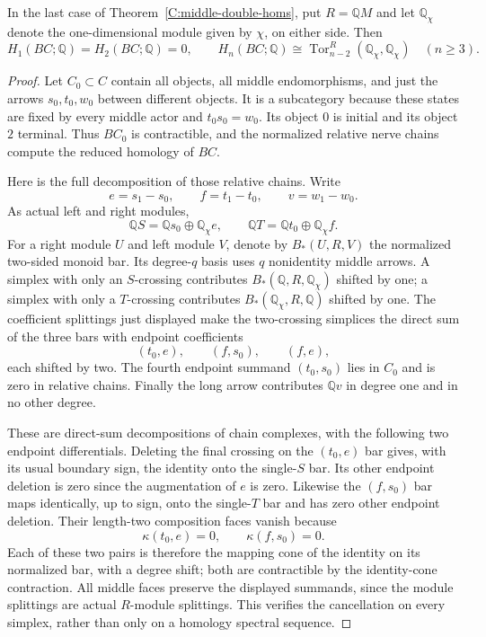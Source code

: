 \begin{lemma}
\label{C:AND-middle-bar}
In the last case of Theorem~\ref{C:middle-double-homs}, put
$R=\mathbb QM$ and let $\mathbb Q_\chi$ denote the
one-dimensional module given by $\chi$, on either side.
Then
\[
 H_1(BC;\mathbb Q)=H_2(BC;\mathbb Q)=0,
 \qquad
 H_n(BC;\mathbb Q)\cong
 \operatorname{Tor}_{n-2}^{R}
          (\mathbb Q_\chi,\mathbb Q_\chi)
 \quad(n\geq3).
\]
\end{lemma}
\begin{proof}
Let $C_0\subset C$ contain all objects, all middle
endomorphisms, and just the arrows $s_0,t_0,w_0$ between
different objects.  It is a subcategory because these states
are fixed by every middle actor and $t_0s_0=w_0$.
Its object $0$ is initial and its object $2$ terminal.
Thus $BC_0$ is contractible, and the normalized relative
nerve chains compute the reduced homology of $BC$.

Here is the full decomposition of those relative chains.
Write
\[
 e=s_1-s_0,\qquad f=t_1-t_0,\qquad v=w_1-w_0.
\]
As actual left and right modules,
\[
 \mathbb QS=\mathbb Qs_0\oplus\mathbb Q_\chi e,
 \qquad
 \mathbb QT=\mathbb Qt_0\oplus\mathbb Q_\chi f.
\]
For a right module $U$ and left module $V$, denote by
$B_*(U,R,V)$ the normalized two-sided monoid bar.  Its
degree-$q$ basis uses $q$ nonidentity middle arrows.  A
simplex with only an $S$-crossing contributes
$B_*(\mathbb Q,R,\mathbb Q_\chi)$ shifted by one; a
simplex with only a $T$-crossing contributes
$B_*(\mathbb Q_\chi,R,\mathbb Q)$ shifted by one.
The coefficient splittings just displayed make the
two-crossing simplices the direct sum of the three bars
with endpoint coefficients
\[
 (t_0,e),\qquad (f,s_0),\qquad (f,e),
\]
each shifted by two.  The fourth endpoint summand
$(t_0,s_0)$ lies in $C_0$ and is zero in relative chains.
Finally the long arrow contributes $\mathbb Qv$ in degree
one and in no other degree.

These are direct-sum decompositions of chain complexes,
with the following two endpoint differentials.  Deleting
the final crossing on the $(t_0,e)$ bar gives, with its
usual boundary sign, the identity onto the single-$S$
bar.  Its other endpoint deletion is zero since the
augmentation of $e$ is zero.  Likewise the $(f,s_0)$ bar
maps identically, up to sign, onto the single-$T$ bar and
has zero other endpoint deletion.  Their length-two
composition faces vanish because
\[
 \kappa(t_0,e)=0,\qquad \kappa(f,s_0)=0.
\]
Each of these two pairs is therefore the mapping cone of
the identity on its normalized bar, with a degree shift;
both are contractible by the identity-cone contraction.
All middle faces preserve the displayed summands, since
the module splittings are actual $R$-module splittings.
This verifies the cancellation on every simplex, rather
than only on a homology spectral sequence.


\end{proof}
